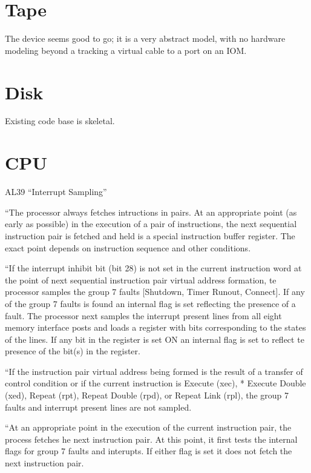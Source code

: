 \documentclass[notitlepage]{report}
\begin{document}
\section {Tape}

The device seems good to go; it is a very abstract model, with no hardware modeling beyond a tracking a virtual cable to a port on an IOM.

\section {Disk}

Existing code base is skeletal.

\section {CPU}

AL39 ``Interrupt Sampling''

``The processor always fetches intructions in pairs. At an appropriate point
(as early as possible) in the execution of a pair of instructions, the
next sequential instruction pair is fetched and held is a special 
instruction buffer register. The exact point depends on instruction
sequence and other conditions.

``If the interrupt inhibit bit (bit 28) is not set in the current instruction
word at the point of next sequential instruction pair virtual address 
formation, te processor samples the group 7 faults [Shutdown, Timer Runout,
Connect]. If any of the group 7 faults is found an internal flag is set
reflecting the presence of a fault. The processor next samples the interrupt
present lines from all eight memory interface posts and loads a register
with bits corresponding to the states of the lines. If any bit in the
register is set ON an internal flag is set to reflect te presence of the
bit(s) in the register.

``If the instruction pair virtual address being formed is the result of a
transfer of control condition or if the current instruction is Execute (xec), * Execute Double (xed), Repeat (rpt), Repeat Double (rpd), or Repeat Link
(rpl), the group 7 faults and interrupt present lines are not sampled.

``At an appropriate point in the execution of the current instruction pair,
the process fetches he next instruction pair. At this point, it first tests
the internal flags for group 7 faults and interupts. If either flag is set
it does not fetch the next instruction pair.
\end{document}
